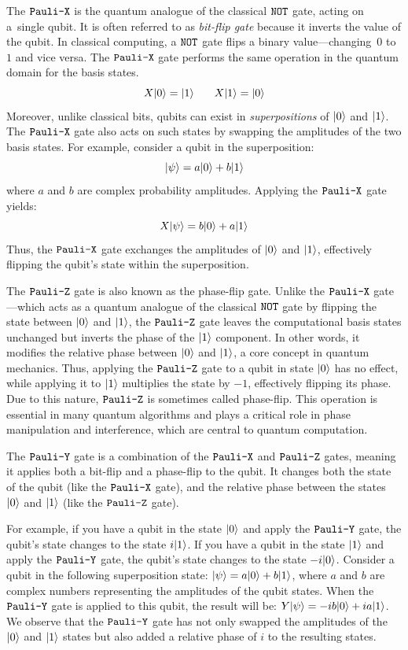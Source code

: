 The $\texttt{Pauli-X}$ is the quantum analogue of the classical $\mathtt{NOT}$ gate, acting on a~single qubit. 
%
It is often referred to as \emph{bit-flip gate} because it inverts the value of the qubit.
%
In classical computing, a $\mathtt{NOT}$ gate flips a binary value---changing~$0$ to~$1$ and vice versa. 
%
The $\texttt{Pauli-X}$ gate performs the same operation in the quantum domain for the basis states.
%
\[
X|0\rangle = |1\rangle\;\;\; \quad X|1\rangle = |0\rangle
\]
Moreover, unlike classical bits, qubits can exist in \emph{superpositions} of $|0\rangle$ and $|1\rangle$. The $\texttt{Pauli-X}$ gate also acts on such states by swapping the amplitudes of the two basis states. For example, consider a qubit in the superposition:
%
\[
|\psi\rangle = a|0\rangle + b|1\rangle
\]
%
where $a$ and $b$ are complex probability amplitudes. Applying the $\texttt{Pauli-X}$ gate yields:
%
\[
X|\psi\rangle = b|0\rangle + a|1\rangle
\]
%
Thus, the $\texttt{Pauli-X}$ gate exchanges the amplitudes of $|0\rangle$ and $|1\rangle$, effectively flipping the qubit's state within the superposition.

The $\texttt{Pauli-Z}$ gate is also known as the phase-flip gate. 
%
Unlike the $\texttt{Pauli-X}$ gate—which acts as a quantum analogue of the classical $\mathtt{NOT}$ gate by flipping the state between $|0\rangle$ and $|1\rangle$, the $\texttt{Pauli-Z}$ gate leaves the computational basis states unchanged but inverts the phase of the $|1\rangle$ component. In other words, it modifies the relative phase between $|0\rangle$ and $|1\rangle$, a core concept in quantum mechanics.
%
Thus, applying the $\texttt{Pauli-Z}$ gate to a qubit in state $|0\rangle$ has no effect, while applying it to $|1\rangle$ multiplies the state by $-1$, effectively flipping its phase.
%
Due to this nature,  $\texttt{Pauli-Z}$ is sometimes called phase-flip.
%
This operation is essential in many quantum algorithms and plays a critical role in phase manipulation and interference, which are central to quantum computation.

%
%
The $\texttt{Pauli-Y}$ gate is a combination of the $\texttt{Pauli-X}$ and $\texttt{Pauli-Z}$ gates, meaning it applies both a bit-flip and a phase-flip to the qubit. 
%
It changes both the state of the qubit (like the $\texttt{Pauli-X}$ gate), and the relative phase between the states $|0\rangle$ and $|1\rangle$ (like the $\texttt{Pauli-Z}$ gate).

For example, if you have a qubit in the state $|0\rangle$ and apply the $\texttt{Pauli-Y}$ gate, the qubit's state changes to the state $i|1\rangle$. 
%
If you have a qubit in the state $|1\rangle$ and apply the $\texttt{Pauli-Y}$ gate, the qubit's state changes to the state $-i|0\rangle$.
%
Consider a qubit in the following superposition state:
$|\psi\rangle= a|0\rangle + b|1\rangle$, where $a$ and $b$ are complex numbers representing the amplitudes of the qubit states.
When the $\texttt{Pauli-Y}$ gate is applied to this qubit, the result will be:
$Y|\psi\rangle = -i b|0\rangle + i a|1\rangle$.
%
We observe that the $\texttt{Pauli-Y}$ gate has not only swapped the amplitudes of the $|0\rangle$ and $|1\rangle$ states but also added a relative phase of $i$ to the resulting states.

